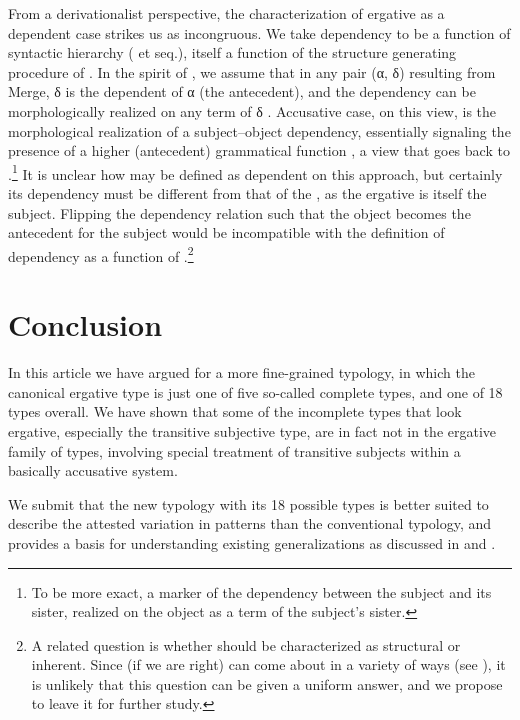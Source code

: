 \documentclass[output=paper]{langsci/langscibook}
\begin{document}
From a derivationalist perspective, the characterization of ergative as a
dependent case strikes us as incongruous. We take dependency to be a function
of syntactic hierarchy (\citealt{Zwart2004} et seq.), itself a function of the
structure generating procedure  of \citet{Chomsky1993}. In the spirit of
\citet{Epstein1999}, we assume that in any pair (α, δ) resulting from Merge, δ
is the dependent of α (the antecedent), and the dependency can be
morphologically realized on any term of δ \citep{Zwart2006b}. Accusative case,
on this view, is the morphological realization of a subject--object dependency,
essentially signaling the presence of a higher (antecedent) grammatical
function \citep{Zwart2006a}, a view that goes back to
\citet{Jakobson1936}.\footnote{To be more exact, a marker of the dependency
between the subject and its sister, realized on the object as a term of the
subject’s sister.\label{fn:29}} It is unclear how  may be defined
as dependent on this approach, but certainly its dependency must be different
from that of the , as the ergative is itself the subject.
Flipping the dependency relation such that the object becomes the antecedent
for the subject would be incompatible with the definition of dependency as a
function of .\footnote{A related question is whether  should
    be characterized as structural or inherent. Since (if we are right)
     can come about in a variety of ways (see
    ), it is unlikely that this question can be given a
uniform answer, and we propose to leave it for further study.\label{fn:30}}

\section{Conclusion}\label{sec:11.7}

In this article we have argued for a more fine-grained  typology, in
which  the canonical ergative  type is just one of five so-called
complete types, and one of 18 types overall. We have shown that some of the
incomplete types that look ergative, especially the transitive subjective type,
are in fact not in the ergative family of types, involving special treatment of
transitive subjects within a basically accusative  system.

We submit that the new  typology with its 18 possible types is better
suited to describe the attested variation in  patterns than the
conventional  typology, and provides a basis for understanding
existing  generalizations as discussed in \citet{Sheehan2014} and
\citet{Deal2015}.
\end{document}
